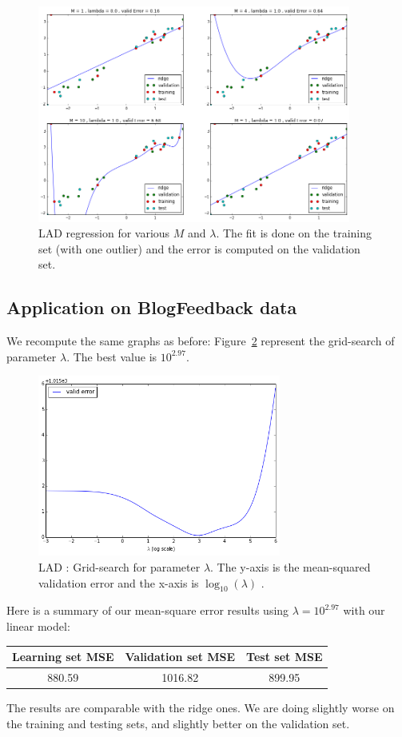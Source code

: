 \begin{figure}[h]
  \centering
 \includegraphics[width=10.3cm]{../Figures/Q4/lad2.png}
\caption{LAD regression for various $M$ and $\lambda$. The fit is done on the training set (with one outlier) and the error is computed on the validation set.}
\label{fig:lad2}
\end{figure}

\subsection{Application on BlogFeedback data}
We recompute the same graphs as before: Figure~\ref{fig:grid2} represent the grid-search of parameter $\lambda$. The best value is $10^{2.97}$.
\begin{figure}[h]
  \centering
 \includegraphics[width=8cm]{../Figures/Q4/grid.png}
\caption{LAD : Grid-search for parameter $\lambda$. The y-axis is the mean-squared validation error and the x-axis is $\log_{10}(\lambda)$ .}
\label{fig:grid2}
\end{figure}

Here is a summary of our mean-square error results using $\lambda = 10^{2.97}$ with our linear model:
\begin{center}
  \begin{tabular}{| c  | c |c |}
    \hline
 Learning set MSE & Validation set MSE &  Test set MSE \\ \hline
 880.59  &  1016.82 & 899.95 \\
    \hline
  \end{tabular}
\end{center}
The results are comparable with the ridge ones. We are doing slightly worse on the training and testing sets, and slightly better on the validation set.


